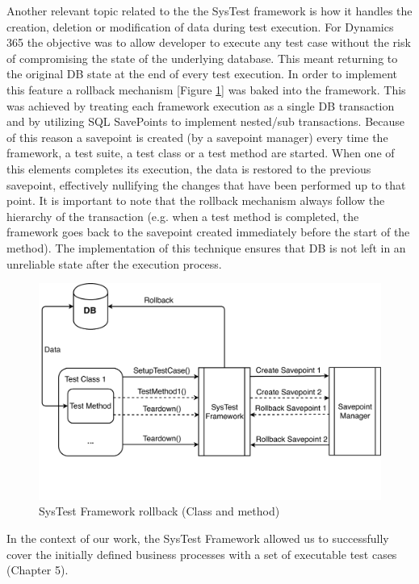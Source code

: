 Another relevant topic related to the the SysTest framework is how it handles the creation, deletion or modification of data during test execution. For Dynamics 365 the objective was to allow developer to execute any test case without the risk of compromising the state of the underlying database. This meant returning to the original DB state at the end of every test execution. In order to implement this feature a rollback mechanism [Figure \ref{fig:SysTestRollback}] was baked into the framework. This was achieved by treating each framework execution as a single DB transaction and by utilizing SQL SavePoints to implement nested/sub transactions. Because of this reason a savepoint is created (by a savepoint manager) every time the framework, a test suite, a test class or a test method are started. When one of this elements completes its execution, the data is restored to the previous savepoint, effectively nullifying the changes that have been performed up to that point. It is important to note that the rollback mechanism always follow the hierarchy of the transaction (e.g. when a test method is completed, the framework goes back to the savepoint created immediately before the start of the method). The implementation of this technique ensures that DB is not left in an unreliable state after the execution process.

\begin{figure}[ht]
	\centering
	\includegraphics[scale=0.45]{Images/SysTestRollback.pdf}
	\caption{SysTest Framework rollback (Class and method)}
	\label{fig:SysTestRollback}
\end{figure}

In the context of our work, the SysTest Framework allowed us to successfully cover the initially defined business processes with a set of executable test cases (Chapter 5).
